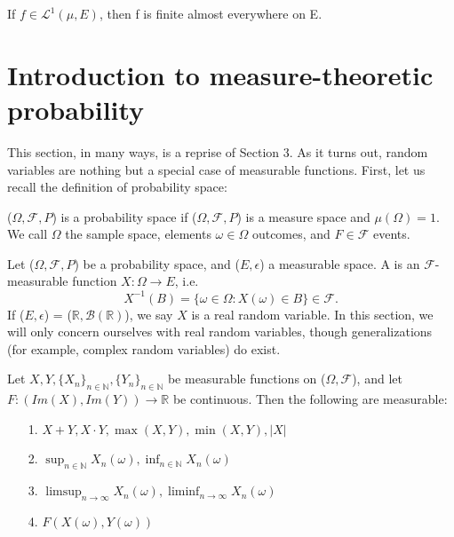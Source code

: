 \documentclass[11pt]{scrartcl}
\begin{document}
\begin{exercise}
If $f\in \mathscr{L}^1(\mu,E)$, then f is finite almost everywhere on E.
\end{exercise}







\section{Introduction to measure-theoretic probability}

This section, in many ways, is a reprise of Section 3. As it turns out, random variables are nothing but a special case of measurable functions. First, let us recall the definition of probability space:



\begin{definition}
($\Omega,\mathcal{F},P$) is a probability space if ($\Omega,\mathcal{F},P$) is a measure space and $\mu(\Omega) = 1$. We call $\Omega$ the sample space, elements $\omega \in \Omega$ outcomes, and $F \in \mathcal F$ events.
\end{definition}

\begin{definition}
Let ($\Omega,\mathcal{F},P$) be a probability space, and ($E,\mathcal{\epsilon}$) a measurable space. A  is an $\mathcal{F}$-measurable function $X: \Omega \rightarrow E$, i.e. $$X^{-1}(B)=\{\omega \in \Omega: X(\omega) \in B\} \in \mathcal{F}.$$
If ($E,\mathcal{\epsilon}$) = ($\mathbb{R},\mathcal{B}(\mathbb{R})$), we say $X$ is a real random variable. In this section, we will only concern ourselves with real random variables, though generalizations (for example, complex random variables) do exist.
\end{definition}

\begin{theorem}
Let $X, Y,\{X_n\}_{n\in \mathbb{N}},\{Y_n\}_{n\in \mathbb{N}}$ be measurable functions on ($\Omega,\mathcal{F}$), and let \\$F: (Im(X),Im(Y)) \rightarrow \mathbb{R}$ be continuous. Then the following are measurable:
\begin{itemize}
\item[1.] $X + Y, X\cdot Y, \max(X,Y), \min(X,Y), |X|$ 
\item[2.] $\sup_{n\in \mathbb{N}} X_n(\omega), \inf_{n\in \mathbb{N}} X_n(\omega)$
\item[3.] $\limsup_{n\rightarrow \infty} X_n(\omega), \liminf_{n\rightarrow \infty} X_n(\omega)$
\item[4.] $F(X(\omega),Y(\omega))$
\end{itemize}
\end{theorem}
\end{document}
